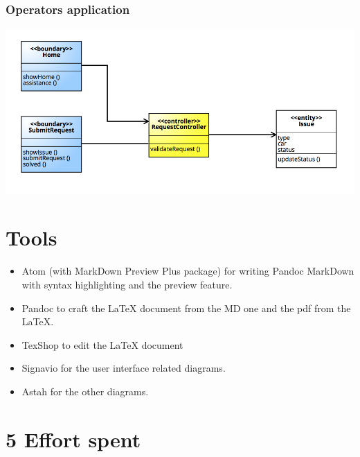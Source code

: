 \documentclass[]{article}
\providecommand{\tightlist}{%
  \setlength{\itemsep}{0pt}\setlength{\parskip}{0pt}}
\begin{document}
\subsubsection{Operators application}\label{operators-application-1}

\centerline{\includegraphics{./images/BCE_Operator.png}}

\section{Tools}\label{tools}

\begin{itemize}
\tightlist
\item
  Atom (with MarkDown Preview Plus package) for writing Pandoc MarkDown
  with syntax highlighting and the preview feature.
\item
  Pandoc to craft the LaTeX document from the MD one and the pdf from
  the LaTeX.
\item
  TexShop to edit the LaTeX document
\item
  Signavio for the user interface related diagrams.
\item
  Astah for the other diagrams.
\end{itemize}

\section{5 Effort spent}\label{effort-spent}
\end{document}
